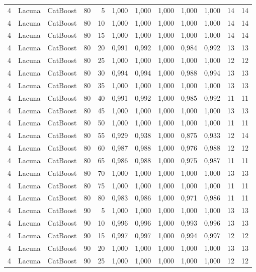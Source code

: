 \begin{longtable}{@{}rllrrrrrrrrr@{}}
4 & Lacuna & CatBoost & 80 & 5 & 1,000 & 1,000 & 1,000 & 1,000 & 1,000 & 14 & 14 \\
4 & Lacuna & CatBoost & 80 & 10 & 1,000 & 1,000 & 1,000 & 1,000 & 1,000 & 14 & 14 \\
4 & Lacuna & CatBoost & 80 & 15 & 1,000 & 1,000 & 1,000 & 1,000 & 1,000 & 14 & 14 \\
4 & Lacuna & CatBoost & 80 & 20 & 0,991 & 0,992 & 1,000 & 0,984 & 0,992 & 13 & 13 \\
4 & Lacuna & CatBoost & 80 & 25 & 1,000 & 1,000 & 1,000 & 1,000 & 1,000 & 12 & 12 \\
4 & Lacuna & CatBoost & 80 & 30 & 0,994 & 0,994 & 1,000 & 0,988 & 0,994 & 13 & 13 \\
4 & Lacuna & CatBoost & 80 & 35 & 1,000 & 1,000 & 1,000 & 1,000 & 1,000 & 13 & 13 \\
4 & Lacuna & CatBoost & 80 & 40 & 0,991 & 0,992 & 1,000 & 0,985 & 0,992 & 11 & 11 \\
4 & Lacuna & CatBoost & 80 & 45 & 1,000 & 1,000 & 1,000 & 1,000 & 1,000 & 13 & 13 \\
4 & Lacuna & CatBoost & 80 & 50 & 1,000 & 1,000 & 1,000 & 1,000 & 1,000 & 11 & 11 \\
4 & Lacuna & CatBoost & 80 & 55 & 0,929 & 0,938 & 1,000 & 0,875 & 0,933 & 12 & 14 \\
4 & Lacuna & CatBoost & 80 & 60 & 0,987 & 0,988 & 1,000 & 0,976 & 0,988 & 12 & 12 \\
4 & Lacuna & CatBoost & 80 & 65 & 0,986 & 0,988 & 1,000 & 0,975 & 0,987 & 11 & 11 \\
4 & Lacuna & CatBoost & 80 & 70 & 1,000 & 1,000 & 1,000 & 1,000 & 1,000 & 13 & 13 \\
4 & Lacuna & CatBoost & 80 & 75 & 1,000 & 1,000 & 1,000 & 1,000 & 1,000 & 11 & 11 \\
4 & Lacuna & CatBoost & 80 & 80 & 0,983 & 0,986 & 1,000 & 0,971 & 0,986 & 11 & 11 \\
4 & Lacuna & CatBoost & 90 & 5 & 1,000 & 1,000 & 1,000 & 1,000 & 1,000 & 13 & 13 \\
4 & Lacuna & CatBoost & 90 & 10 & 0,996 & 0,996 & 1,000 & 0,993 & 0,996 & 13 & 13 \\
4 & Lacuna & CatBoost & 90 & 15 & 0,997 & 0,997 & 1,000 & 0,994 & 0,997 & 12 & 12 \\
4 & Lacuna & CatBoost & 90 & 20 & 1,000 & 1,000 & 1,000 & 1,000 & 1,000 & 13 & 13 \\
4 & Lacuna & CatBoost & 90 & 25 & 1,000 & 1,000 & 1,000 & 1,000 & 1,000 & 12 & 12 \\

\end{longtable}
